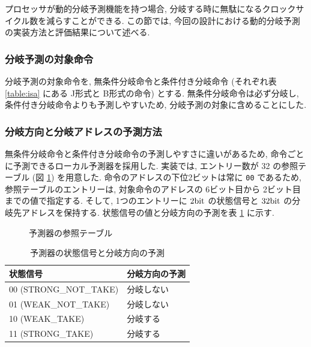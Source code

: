 \documentclass[../improvements.tex]{subflies}
\begin{document}
  プロセッサが動的分岐予測機能を持つ場合, 
  分岐する時に無駄になるクロックサイクル数を減らすことができる.
  この節では, 今回の設計における動的分岐予測の実装方法と評価結果について述べる.

  \subsubsection{分岐予測の対象命令}
  分岐予測の対象命令を, 無条件分岐命令と条件付き分岐命令 
  (それぞれ表 \ref{table:isa} にある J形式と B形式の命令) とする.
  無条件分岐命令は必ず分岐し, 条件付き分岐命令よりも予測しやすいため, 
  分岐予測の対象に含めることにした.

  \subsubsection{分岐方向と分岐アドレスの予測方法}
  無条件分岐命令と条件付き分岐命令の予測しやすさに違いがあるため, 
  命令ごとに予測できるローカル予測器を採用した\cite{ca-quantitative-approach}.
  実装では, エントリー数が 32 の参照テーブル (図 \ref{fig:predictor-table}) を用意した.
  命令のアドレスの下位2ビットは常に \verb|00| であるため, 
  参照テーブルのエントリーは, 対象命令のアドレスの 6ビット目から 2ビット目までの値で指定する.
  そして, 1つのエントリーに $2\unit{\bit}$ の状態信号と $32\unit{\bit}$ の分岐先アドレスを保持する.
  状態信号の値と分岐方向の予測を表 \ref{table:predictor-state} に示す.

  \begin{figure}
    \caption{予測器の参照テーブル}
    \label{fig:predictor-table}
  \end{figure}

  \begin{table}[h!]
    \centering
    \begin{tabular}{|l|l|}
    \hline
    状態信号 & 分岐方向の予測 \\ \hline
    00 (STRONG\_NOT\_TAKE) & 分岐しない \\
    01 (WEAK\_NOT\_TAKE) & 分岐しない \\
    10 (WEAK\_TAKE) & 分岐する \\
    11 (STRONG\_TAKE) & 分岐する \\ \hline
    \end{tabular}
    \caption{予測器の状態信号と分岐方向の予測}
    \label{table:predictor-state}
  \end{table}
\end{document}
